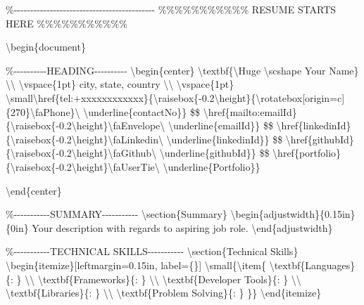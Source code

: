 \%-\/-\/-\/-\/-\/-\/-\/-\/-\/-\/-\/-\/-\/-\/-\/-\/-\/-\/-\/-\/-\/-\/-\/-\/-\/-\/-\/-\/-\/-\/-\/-\/-\/-\/-\/-\/-\/-\/-\/-\/-\/-\/-
\%\%\%\%\%\%\%\%\%\%\% RESUME STARTS HERE \%\%\%\%\%\%\%\%\%\%\%

\textbackslash begin\{document\}

\%-\/-\/-\/-\/-\/-\/-\/-\/-\/-HEADING-\/-\/-\/-\/-\/-\/-\/-\/-\/-
\textbackslash begin\{center\}
\textbackslash textbf\{\textbackslash Huge \textbackslash scshape Your
Name\} \textbackslash\textbackslash{} \textbackslash vspace\{1pt\} city,
state, country \textbackslash\textbackslash{}
\textbackslash vspace\{1pt\}
\textbackslash small\textbackslash href\{tel:+xxxxxxxxxxxx\}\{\textbackslash raisebox\{-0.2\textbackslash height\}\{\textbackslash rotatebox{[}origin=c{]}\{270\}\textbackslash faPhone\}\textbackslash{}
\textbackslash underline\{contactNo\}\} \$\textbar\$
\textbackslash href\{mailto:emailId\}\{\textbackslash raisebox\{-0.2\textbackslash height\}\textbackslash faEnvelope\textbackslash{}
\textbackslash underline\{emailId\}\} \$\textbar\$
\textbackslash href\{linkedinId\}\{\textbackslash raisebox\{-0.2\textbackslash height\}\textbackslash faLinkedin\textbackslash{}
\textbackslash underline\{linkedinId\}\} \$\textbar\$
\textbackslash href\{githubId\}\{\textbackslash raisebox\{-0.2\textbackslash height\}\textbackslash faGithub\textbackslash{}
\textbackslash underline\{githubId\}\} \$\textbar\$
\textbackslash href\{portfolio\}\{\textbackslash raisebox\{-0.2\textbackslash height\}\textbackslash faUserTie\textbackslash{}
\textbackslash underline\{Portfolio\}\}

\textbackslash end\{center\}

\%-\/-\/-\/-\/-\/-\/-\/-\/-\/-\/-SUMMARY-\/-\/-\/-\/-\/-\/-\/-\/-\/-\/-
\textbackslash section\{Summary\}
\textbackslash begin\{adjustwidth\}\{0.15in\}\{0in\} Your description
with regards to aspiring job role. \textbackslash end\{adjustwidth\}

\%-\/-\/-\/-\/-\/-\/-\/-\/-\/-\/-TECHNICAL
SKILLS-\/-\/-\/-\/-\/-\/-\/-\/-\/-\/- \textbackslash section\{Technical
Skills\} \textbackslash begin\{itemize\}{[}leftmargin=0.15in,
label=\{\}{]} \textbackslash small\{\textbackslash item\{
\textbackslash textbf\{Languages\}\{: \} \textbackslash\textbackslash{}
\textbackslash textbf\{Frameworks\}\{: \} \textbackslash\textbackslash{}
\textbackslash textbf\{Developer Tools\}\{: \}
\textbackslash\textbackslash{} \textbackslash textbf\{Libraries\}\{: \}
\textbackslash\textbackslash{} \textbackslash textbf\{Problem
Solving\}\{: \} \}\} \textbackslash end\{itemize\}

